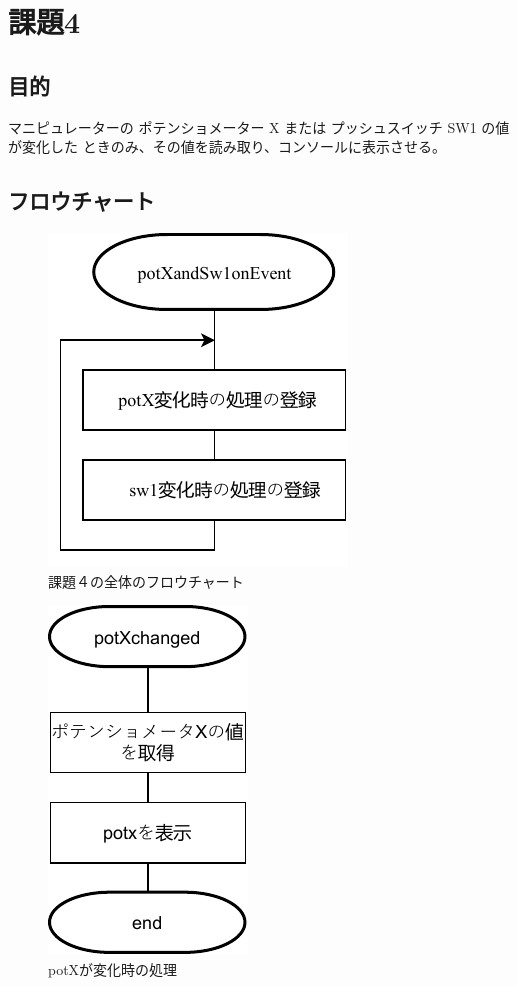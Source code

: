 \documentclass{jarticle}
\begin{document}
\section{課題4}
\subsection{目的}
 マニピュレーターの ポテンショメーター X または プッシュスイッチ SW1 の値が変化した ときのみ、その値を読み取り、コンソールに表示させる。

\subsection{フロウチャート}

\begin{figure}[H]
    \centering
    \includegraphics{kumikomi4.pdf}
    \caption{課題４の全体のフロウチャート}
    \label{fig:my_label}
\end{figure}

\begin{figure}[H]
    \centering
    \includegraphics{kumikomi4potXchenged.pdf}
    \caption{potXが変化時の処理}
    \label{fig:my_label}
\end{figure}
\end{document}

